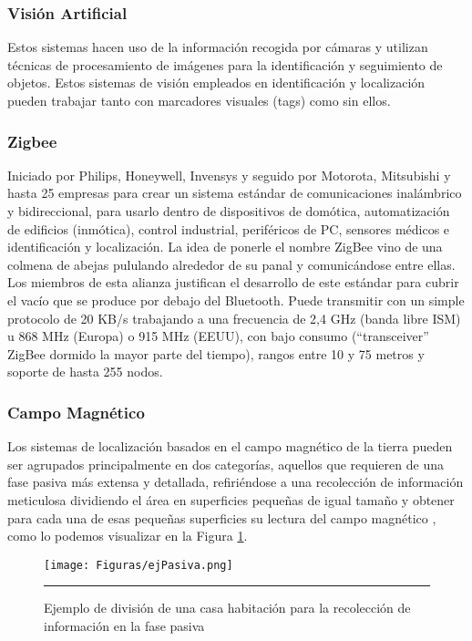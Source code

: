 \subsubsection{Visión Artificial}

Estos sistemas hacen uso de la información recogida por cámaras y utilizan técnicas de procesamiento de imágenes para la identificación y seguimiento de objetos. Estos sistemas de visión empleados en identificación y localización pueden trabajar tanto con marcadores visuales (tags) como sin ellos. 

\subsubsection{Zigbee}

Iniciado por Philips, Honeywell, Invensys y seguido por Motorota, Mitsubishi y hasta 25 empresas para crear un sistema estándar de comunicaciones inalámbrico y bidireccional, para usarlo dentro de dispositivos de domótica, automatización de edificios (inmótica), control industrial, periféricos de PC, sensores médicos e identificación y localización. La idea de ponerle el nombre ZigBee vino de una colmena de abejas pululando alrededor de su panal y comunicándose entre ellas.
Los miembros de esta alianza justifican el desarrollo de este estándar para cubrir el vacío que se produce por debajo del Bluetooth. Puede transmitir con un simple protocolo de 20 KB/s trabajando a una frecuencia de 2,4 GHz (banda libre ISM) u 868 MHz (Europa) o 915 MHz (EEUU), con bajo consumo (“transceiver” ZigBee dormido la mayor parte del tiempo), rangos entre 10 y 75 metros y soporte de hasta 255 nodos. 

\subsubsection{Campo Magnético}

Los sistemas de localización basados en el campo magnético de la tierra pueden ser agrupados principalmente en dos categorías, aquellos que requieren de una fase pasiva más extensa y detallada, refiriéndose a una recolección de información meticulosa dividiendo el área en superficies pequeñas de igual tamaño y obtener para cada una de esas pequeñas superficies su lectura del campo magnético \cite{usoCampoMagnetico}, como lo podemos visualizar en la Figura \ref{fig:ejPasiva}.

\begin{figure}[htbp]
	\centering
		\texttt{[image: Figuras/ejPasiva.png]}
		\rule{35em}{0.5pt}
	\caption[División de una casa habitación para la recolección de información en la fase pasiva]{Ejemplo de división de una casa habitación para la recolección de información en la fase pasiva}
	\label{fig:ejPasiva}
\end{figure}

